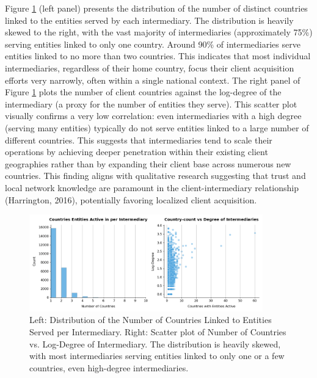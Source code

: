 Figure \ref{fig:geography_distribution_countries_by_intermediary} (left panel) presents the distribution of the number of distinct countries linked to the entities served by each intermediary. The distribution is heavily skewed to the right, with the vast majority of intermediaries (approximately 75\%) serving entities linked to only one country. Around 90\% of intermediaries serve entities linked to no more than two countries. This indicates that most individual intermediaries, regardless of their home country, focus their client acquisition efforts very narrowly, often within a single national context. The right panel of Figure \ref{fig:geography_distribution_countries_by_intermediary} plots the number of client countries against the log-degree of the intermediary (a proxy for the number of entities they serve). This scatter plot visually confirms a very low correlation: even intermediaries with a high degree (serving many entities) typically do not serve entities linked to a large number of different countries. This suggests that intermediaries tend to scale their operations by achieving deeper penetration within their existing client geographies rather than by expanding their client base across numerous new countries. This finding aligns with qualitative research suggesting that trust and local network knowledge are paramount in the client-intermediary relationship (Harrington, 2016), potentially favoring localized client acquisition.

\begin{figure}[htbp]
    \centering
    \includegraphics[width=0.9\textwidth]{images/Geography_Distribution_of_Countries_by_Intermediary.png} %
    \caption{Left: Distribution of the Number of Countries Linked to Entities Served per Intermediary. Right: Scatter plot of Number of Countries vs. Log-Degree of Intermediary. The distribution is heavily skewed, with most intermediaries serving entities linked to only one or a few countries, even high-degree intermediaries.}
    \label{fig:geography_distribution_countries_by_intermediary}
\end{figure}

